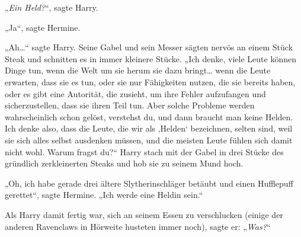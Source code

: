 „\emph{Ein Held?}“, sagte Harry.

„Ja“, sagte Hermine.

„Ah…“ sagte Harry. Seine Gabel und sein Messer sägten nervös an einem Stück Steak und schnitten es in immer kleinere Stücke. „Ich denke, viele Leute können Dinge tun, wenn die Welt um sie herum sie dazu bringt… wenn die Leute erwarten, dass sie es tun, oder sie nur Fähigkeiten nutzen, die sie bereits haben, oder es gibt eine Autorität, die zusieht, um ihre Fehler aufzufangen und sicherzustellen, dass sie ihren Teil tun. Aber solche Probleme werden wahrscheinlich schon gelöst, verstehst du, und dann braucht man keine Helden. Ich denke also, dass die Leute, die wir als ‚Helden‘ bezeichnen, selten sind, weil sie sich alles selbst ausdenken müssen, und die meisten Leute fühlen sich damit nicht wohl. Warum fragst du?“ Harry stach mit der Gabel in drei Stücke des gründlich zerkleinerten Steaks und hob sie zu seinem Mund hoch.

„Oh, ich habe gerade drei ältere Slytherinschläger betäubt und einen Hufflepuff gerettet“, sagte Hermine. „Ich werde eine Heldin sein.“

Als Harry damit fertig war, sich an seinem Essen zu verschlucken (einige der anderen Ravenclaws in Hörweite husteten immer noch), sagte er: „\emph{Was?}“

